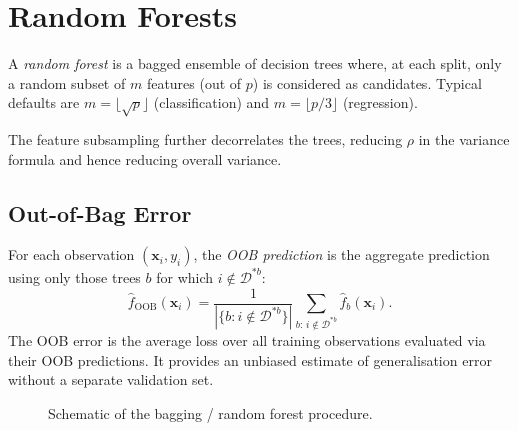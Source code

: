 \section{Random Forests}

\begin{definition}
A \emph{random forest} is a bagged ensemble of decision trees where, at each split, only a random subset of $m$ features (out of $p$) is considered as candidates. Typical defaults are $m=\lfloor\sqrt{p}\rfloor$ (classification) and $m=\lfloor p/3\rfloor$ (regression).
\end{definition}

The feature subsampling further decorrelates the trees, reducing $\rho$ in the variance formula and hence reducing overall variance.

\subsection{Out-of-Bag Error}

\begin{definition}
For each observation $(\bm{x}_i,y_i)$, the \emph{OOB prediction} is the aggregate prediction using only those trees $b$ for which $i\notin\mathcal{D}^{*b}$:
\[
  \hat f_{\text{OOB}}(\bm{x}_i) = \frac{1}{|\{b:i\notin\mathcal{D}^{*b}\}|}
    \sum_{b:\,i\notin\mathcal{D}^{*b}} \hat f_b(\bm{x}_i).
\]
The OOB error is the average loss over all training observations evaluated via their OOB predictions. It provides an unbiased estimate of generalisation error without a separate validation set.
\end{definition}

\begin{figure}[ht]
\centering
{}
\caption{Schematic of the bagging / random forest procedure.}
\label{fig:bagging-schema}
\end{figure}

